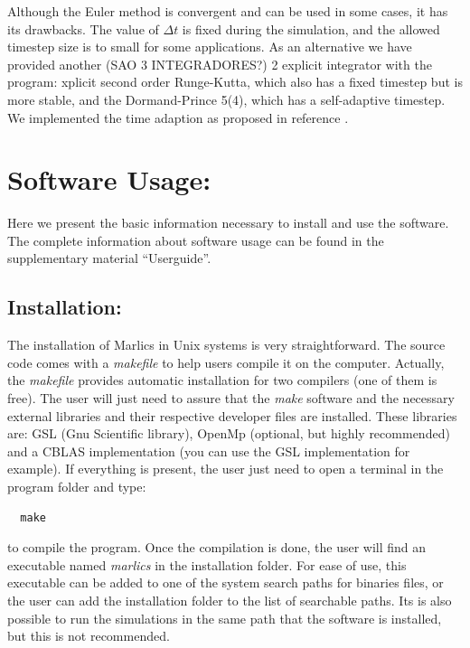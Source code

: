 \documentclass[final,5p,times,twocolumn]{elsarticle}
\begin{document}
Although the Euler method is convergent and can be used in some cases,
it has its drawbacks. The value of $\Delta t $ is fixed during the
simulation, and the allowed timestep size is to small for some
applications. As an alternative we have provided another (SAO 3 INTEGRADORES?) 2 explicit
integrator with the program: xplicit second order Runge-Kutta, which
also has a fixed timestep but is more stable, and the Dormand-Prince
5(4), which has a self-adaptive timestep. We implemented the time
adaption as proposed in reference \cite{hairer2008solving}.

\section{Software Usage:} \label{sec:software_usage}

Here we present the basic information necessary to install and use the
software. The complete information about software usage can be found
in the supplementary material ``Userguide''.

\subsection{Installation:}

The installation of Marlics in Unix systems is very
straightforward. The source code comes with a \textit{makefile} to
help users compile it on the computer. Actually, the {\it makefile} provides
 automatic installation for two compilers (one of them is free).
The user will  just need to assure that the \textit{make}
software and the necessary external libraries and their respective
developer files are installed. These libraries are: GSL (Gnu Scientific
library), OpenMp (optional, but highly recommended) and a CBLAS
implementation (you can use the GSL implementation for example). If
everything is present, the user just need to open a terminal in the
program folder and type:
{\it
\begin{lstlisting}
  make
\end{lstlisting}
}
\noindent to compile the program. Once the compilation is done, the user will
find an executable named \textit{marlics} in the installation
folder. For ease of use, this executable can be added to one of the
system search paths for binaries files, or the user can add the
installation folder to the list of searchable paths. Its is also
possible to run the simulations in the same path that the software is installed, but this is not recommended.
\end{document}
